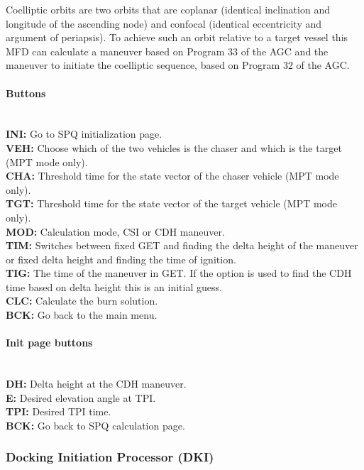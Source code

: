 \documentclass[11pt]{article} %
\begin{document}
Coelliptic orbits are two orbits that are coplanar (identical inclination and longitude of the ascending node) and confocal (identical eccentricity and argument of periapsis). To achieve such an orbit relative to a target vessel this MFD can calculate a maneuver based on Program 33 of the AGC and the maneuver to initiate the coelliptic sequence, based on Program 32 of the AGC.\\

\paragraph{Buttons}\mbox{} \\

\textbf{INI:} Go to SPQ initialization page.\\
\textbf{VEH:} Choose which of the two vehicles is the chaser and which is the target (MPT mode only).\\
\textbf{CHA:} Threshold time for the state vector of the chaser vehicle (MPT mode only).\\
\textbf{TGT:} Threshold time for the state vector of the target vehicle (MPT mode only).\\
\textbf{MOD:} Calculation mode, CSI or CDH maneuver.\\
\textbf{TIM:} Switches between fixed GET and finding the delta height of the maneuver or fixed delta height and finding the time of ignition.\\
\textbf{TIG:} The time of the maneuver in GET. If the option is used to find the CDH time based on delta height this is an initial guess.\\
\textbf{CLC:} Calculate the burn solution.\\
\textbf{BCK:} Go back to the main menu.\\

\paragraph{Init page buttons}\mbox{} \\

\textbf{DH:} Delta height at the CDH maneuver.\\
\textbf{E:} Desired elevation angle at TPI.\\
\textbf{TPI:} Desired TPI time.\\
\textbf{BCK:} Go back to SPQ calculation page.\\
\newpage

\subsubsection{Docking Initiation Processor (DKI)}
\end{document}
